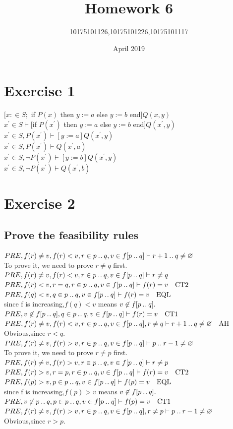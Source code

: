 \documentclass[11pt,a4paper,fleqn]{article}
\title{Homework 6}
\author{10175101126,10175101226,10175101117}
\date{April 2019}
\begin{document}
\maketitle

\section{ Exercise 1}
\noindent
$[x:\in S;$ if $P(x)$ then $y:=a$ else $y:=b$ end]$Q(x,y)$\\
$x^{'}\in S\vdash $[if $P(x^{'})$ then $y:=a$ else $y:=b$ end]$Q(x^{'},y)$\\
$x^{'}\in S,P(x^{'})\vdash [y:=a]Q(x^{'},y)$\\
$x^{'}\in S,P(x^{'})\vdash Q(x^{'},a)$\\
$x^{'}\in S,\neg P(x^{'})\vdash [y:=b]Q(x^{'},y)$\\
$x^{'}\in S,\neg P(x^{'})\vdash Q(x^{'},b)$
\section{Exercise 2}
\subsection{Prove the feasibility rules}
\noindent
$PRE,f(r)\not=v,f(r)<v,r\in p\mathbin{.\mkern1mu.} q,v\in f[p\mathbin{.\mkern1mu.} q]\vdash r+1\mathbin{.\mkern1mu.} q \not=\mathord\varnothing$\\
To prove it, we need to prove $r\not=q$ first.\\
$PRE,f(r)\not=v,f(r)<v,r\in p\mathbin{.\mkern1mu.} q,v\in f[p\mathbin{.\mkern1mu.} q]\vdash r\not=q$\\
$PRE,f(r)<v,r=q,r\in p\mathbin{.\mkern1mu.} q,v\in f[p\mathbin{.\mkern1mu.} q]\vdash f(r)=v\quad\text{CT2}$\\
$PRE,f(q)<v,q\in p\mathbin{.\mkern1mu.} q,v\in f[p\mathbin{.\mkern1mu.} q]\vdash f(r)=v\quad\text{EQL}$\\
since f is increasing,$f(q)<v$ means $v\not\in f[p\mathbin{.\mkern1mu.} q].$\\  
$PRE,v\not\in f[p\mathbin{.\mkern1mu.} q],q\in p\mathbin{.\mkern1mu.} q,v\in f[p\mathbin{.\mkern1mu.} q]\vdash f(r)=v\quad\text{CT1}$\\
$PRE,f(r)\not=v,f(r)<v,r\in p\mathbin{.\mkern1mu.} q,v\in f[p\mathbin{.\mkern1mu.} q],r\not=q\vdash r+1\mathbin{.\mkern1mu.} q \not=\mathord\varnothing\quad\text{AH}$\\
Obvious,since $r<q$.\\
$PRE,f(r)\not=v,f(r)>v,r\in p\mathbin{.\mkern1mu.} q,v\in f[p\mathbin{.\mkern1mu.} q]\vdash p\mathbin{.\mkern1mu.} r-1 \not=\mathord\varnothing$\\
To prove it, we need to prove $r\not=p$ first.\\
$PRE,f(r)\not=v,f(r)> v,r\in p\mathbin{.\mkern1mu.} q,v\in f[p\mathbin{.\mkern1mu.} q]\vdash r\not=p$\\
$PRE,f(r)> v,r=p,r\in p\mathbin{.\mkern1mu.} q,v\in f[p\mathbin{.\mkern1mu.} q]\vdash f(r)=v\quad\text{CT2}$\\
$PRE,f(p)> v,p\in p\mathbin{.\mkern1mu.} q,v\in f[p\mathbin{.\mkern1mu.} q]\vdash f(p)=v\quad\text{EQL}$\\
since f is increasing,$f(p)>v$ means $v\not\in f[p\mathbin{.\mkern1mu.} q].$\\  
$PRE,v\not\in p\mathbin{.\mkern1mu.} q,p\in p\mathbin{.\mkern1mu.} q,v\in f[p\mathbin{.\mkern1mu.} q]\vdash f(p)=v\quad\text{CT1}$\\
$PRE,f(r)\not=v,f(r)>v,r\in p\mathbin{.\mkern1mu.} q,v\in f[p\mathbin{.\mkern1mu.} q],r\not=p\vdash p\mathbin{.\mkern1mu.} r-1 \not=\mathord\varnothing$\\
Obvious,since $r>p$.\\
\end{document}
